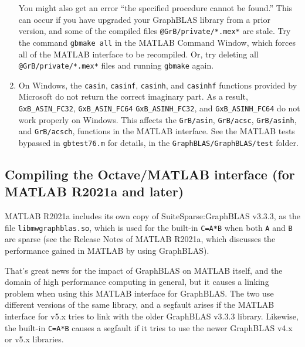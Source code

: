 \documentclass[12pt]{article}
\begin{document}
\begin{enumerate}
    You might also get an error ``the specified procedure cannot be found.''
    This can occur if you have upgraded your GraphBLAS library from a prior
    version, and some of the compiled files \verb'@GrB/private/*.mex*'
    are stale.  Try the command \verb'gbmake all' in the MATLAB Command
    Window, which forces all of the MATLAB interface to be recompiled.
    Or, try deleting all \verb'@GrB/private/*.mex*' files and running
    \verb'gbmake' again.

\item On Windows, the \verb'casin', \verb'casinf', \verb'casinh', and
    \verb'casinhf' functions provided by Microsoft do not return the correct
    imaginary part.  As a result, \verb'GxB_ASIN_FC32', \verb'GxB_ASIN_FC64'
    \verb'GxB_ASINH_FC32', and \verb'GxB_ASINH_FC64' do not work properly on
    Windows.  This affects the \verb'GrB/asin', \verb'GrB/acsc',
    \verb'GrB/asinh', and \verb'GrB/acsch', functions in the MATLAB interface.
    See the MATLAB tests bypassed in \verb'gbtest76.m' for details, in the
    \newline
    \verb'GraphBLAS/GraphBLAS/test' folder.

\end{enumerate}

\subsection{Compiling the Octave/MATLAB interface (for MATLAB R2021a and later)}
\label{R2021a}

MATLAB R2021a includes its own copy of SuiteSparse:GraphBLAS v3.3.3, as the
file \verb'libmwgraphblas.so', which is used for the built-in \verb'C=A*B' when
both \verb'A' and \verb'B' are sparse (see the Release Notes of MATLAB R2021a,
which discusses the performance gained in MATLAB by using GraphBLAS).

That's great news for the impact of GraphBLAS on MATLAB itself, and the domain
of high performance computing in general, but it causes a linking problem when
using this MATLAB interface for GraphBLAS.  The two use different versions of
the same library, and a segfault arises if the MATLAB interface for v5.x tries
to link with the older GraphBLAS v3.3.3 library.  Likewise, the built-in
\verb'C=A*B' causes a segfault if it tries to use the newer GraphBLAS v4.x or
v5.x libraries.
\end{document}

